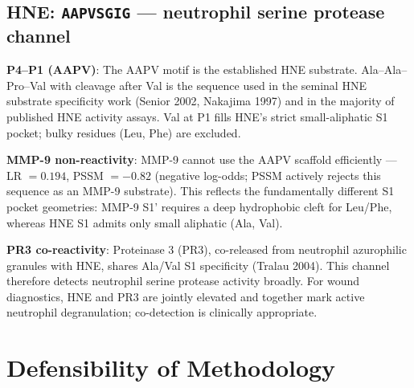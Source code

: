 \documentclass[10pt,a4paper]{article}
\newcommand{\seq}[1]{\texttt{#1}}
\begin{document}
\subsection{HNE: \seq{AAPVSGIG} --- neutrophil serine protease channel}

\textbf{P4--P1 (AAPV)}: The AAPV motif is the established HNE substrate.
Ala--Ala--Pro--Val with cleavage after Val is the sequence used in the
seminal HNE substrate specificity work (Senior 2002, Nakajima 1997)
and in the majority of published HNE activity assays.  Val at P1 fills
HNE's strict small-aliphatic S1 pocket; bulky residues (Leu, Phe) are
excluded.

\textbf{MMP-9 non-reactivity}: MMP-9 cannot use the AAPV scaffold
efficiently --- LR $= 0.194$, PSSM $= -0.82$ (negative log-odds;
PSSM actively rejects this sequence as an MMP-9 substrate).  This
reflects the fundamentally different S1 pocket geometries: MMP-9 S1'
requires a deep hydrophobic cleft for Leu/Phe, whereas HNE S1 admits
only small aliphatic (Ala, Val).

\textbf{PR3 co-reactivity}: Proteinase 3 (PR3), co-released from
neutrophil azurophilic granules with HNE, shares Ala/Val S1 specificity
(Tralau 2004).  This channel therefore detects neutrophil serine protease
activity broadly.  For wound diagnostics, HNE and PR3 are jointly elevated
and together mark active neutrophil degranulation; co-detection is
clinically appropriate.

\section{Defensibility of Methodology}
\end{document}
